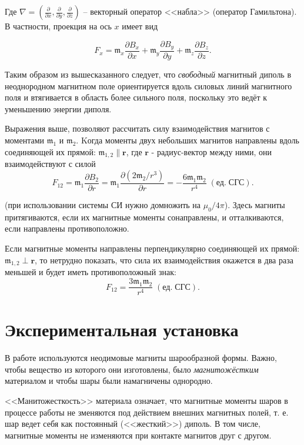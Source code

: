 \documentclass[a4paper,12pt]{article} %
\begin{document}
Где $\nabla = \left(\frac{\partial}{\partial x},\frac{\partial}{\partial y}, \frac{\partial}{\partial z}\right)$ -- векторный оператор <<набла>> (оператор Гамильтона). В частности, проекция на ось $x$ имеет вид

\begin{equation*}
    F_x = \mathfrak{m}_x\frac{\partial B_x}{\partial x} + \mathfrak{m}_y\frac{\partial B_y}{\partial y} + \mathfrak{m}_z\frac{\partial B_z}{\partial z}.
\end{equation*}


Таким образом из вышесказанного следует, что \textit{свободный} магнитный диполь в неоднородном магнитном поле ориентируется вдоль силовых линий магнитного поля и втягивается в область более сильного поля, поскольку это ведёт к уменьшению энергии диполя.

Выражения выше, позволяют рассчитать силу взаимодействия магнитов с моментами $\mathfrak{m}_1$ и $\mathfrak{m}_2$. Kогда моменты двух небольших магнитов направлены вдоль соединяющей их прямой: $\mathfrak{m}_{1,2} \| \textbf{r}$, где $\textbf{r}$ - радиус-вектор между ними, они взаимодействуют с силой 
\begin{equation}
    \label{6}
    F_{12}= \mathfrak{m}_1 \frac{\partial{B_2}}{\partial{r}} = \mathfrak{m}_1\frac{\partial{(2\mathfrak{m}_2/r^3)}}{\partial{r}} = -\frac{6 \mathfrak{m}_1\mathfrak{m}_2}{r^4} \;(\text{ед}.\; \text{СГС}).
\end{equation}

(при использовании системы СИ нужно домножить на $\mu_0 / 4\pi$). Здесь магниты притягиваются, если их магнитные моменты сонаправлены, и отталкиваются, если направлены противоположно.


Если магнитные моменты направлены перпендикулярно соединяющей их прямой: $\mathfrak{m}_{1,2} \perp \textbf{r}$, то нетрудно показать, что сила их взаимодействия окажется в два раза меньшей и будет иметь противоположный знак: $$F_{12} = \frac{3\mathfrak{m}_1 \mathfrak{m}_2}{r^4}\;(\text{ед}.\; \text{СГС}).$$


\section{Экспериментальная установка}

В работе используются неодимовые магниты шарообразной формы. Важно, чтобы вещество из которого они изготовлены, было \textit{магнитожёстким} материалом и чтобы шары были намагничены однородно.


<<Манитожесткость>> материала означает, что магнитные моменты шаров в процессе работы не зменяются под действием внешних магнитных полей, т. е. шар ведет себя как постоянный (<<жесткий>>) диполь. В том числе, магнитные моменты не изменяются при контакте магнитов друг с другом.
\end{document}
